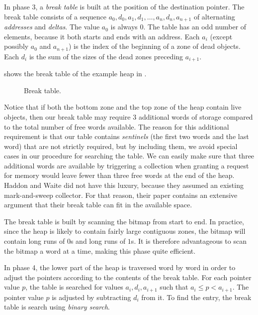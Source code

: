 In phase 3, a \emph{break table} is built at the position of the
destination pointer.  The break table consists of a sequence $a_0,
d_0, a_1, d_1, \ldots, a_n, d_n, a_{n+1}$ of alternating
\emph{addresses} and \emph{deltas}.  The value $a_0$ is always $0$.
The table has an odd number of elements, because it both starts and
ends with an address.  Each $a_i$ (except possibly $a_0$ and
$a_{n+1}$) is the index of the beginning of a zone of dead objects.
Each $d_i$ is the sum of the sizes of the dead zones preceding
$a_{i+1}$.

 shows the break table of the example heap in
.

\begin{figure}
\begin{center}
\end{center}
\caption{\label{fig-example-d}
Break table.}
\end{figure}

Notice that if both the bottom zone and the top zone of the heap
contain live objects, then our break table may require $3$ additional
words of storage compared to the total number of free words available.
The reason for this additional requirement is that our table contains
\emph{sentinels} (the first two words and the last word) that are not
strictly required, but by including them, we avoid special cases in
our procedure for searching the table.  We can easily make sure that
three additional words are available by triggering a collection when
granting a request for memory would leave fewer than three free words
at the end of the heap.  Haddon and Waite \cite{Haddon:1967} did not
have this luxury, because they assumed an existing mark-and-sweep
collector.  For that reason, their paper contains an extensive
argument that their break table can fit in the available space.

The break table is built by scanning the bitmap from start to end.  In
practice, since the heap is likely to contain fairly large contiguous
zones, the bitmap will contain long runs of $0$s and long runs of
$1$s.  It is therefore advantageous to scan the bitmap a word at a
time, making this phase quite efficient. 

In phase 4, the lower part of the heap is traversed word by word in
order to adjust the pointers according to the contents of the break
table.  For each pointer value $p$, the table is searched for values 
$a_i, d_i, a_{i+1}$ such that $a_i \le p < a_{i+1}$.  The
pointer value $p$ is adjusted by subtracting $d_i$ from it.  To find
the entry, the break table is search using \emph{binary search}.

